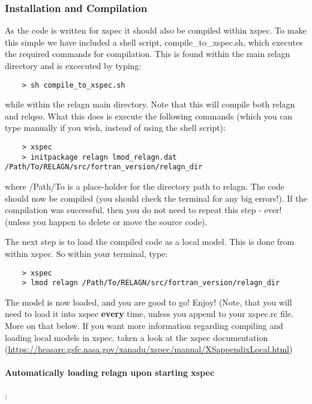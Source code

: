 \documentclass[a4paper, 11pt, times, onecolumn]{article}
\begin{document}
\subsubsection{Installation and Compilation}

As the code is written for {\sc xspec} it should also be compiled within {\sc xspec}. To make this simple we have included a shell script, {\sc compile\_to\_xspec.sh}, which executes the required commands for compilation. This is found within the main {\sc relagn} directory and is excecuted by typing:

\begin{verbatim}
	> sh compile_to_xspec.sh
\end{verbatim}

\noindent
while within the {\sc relagn} main directory. Note that this will compile both {\sc relagn} and {\sc relqso}. What this does is execute the following commands (which you can type manually if you wish, instead of using the shell script):

\begin{verbatim}
	> xspec
	> initpackage relagn lmod_relagn.dat /Path/To/RELAGN/src/fortran_version/relagn_dir
\end{verbatim}

\noindent
where /Path/To is a place-holder for the directory path to {\sc relagn}. The code should now be compiled (you should check the terminal for any big errors!). If the compilation was successful, then you do not need to repeat this step - ever! (unless you happen to delete or move the source code). 

The next step is to load the compiled code as a local model. This is done from within {\sc xspec}. So within your terminal, type:

\begin{verbatim}
	> xspec
	> lmod relagn /Path/To/RELAGN/src/fortran_version/relagn_dir
\end{verbatim}

The model is now loaded, and you are good to go! Enjoy! (Note, that you will need to load it into {\sc xspec} {\bf every} time, unless you append to your {\sc xspec.rc} file. More on that below. If you want more information regarding compiling and loading local models in {\sc xspec}, taken a look at the {\sc xspec} documentation (\url{https://heasarc.gsfc.nasa.gov/xanadu/xspec/manual/XSappendixLocal.html})


\paragraph{Automatically loading {\sc relagn} upon starting {\sc xspec}} 
:
\end{document}
